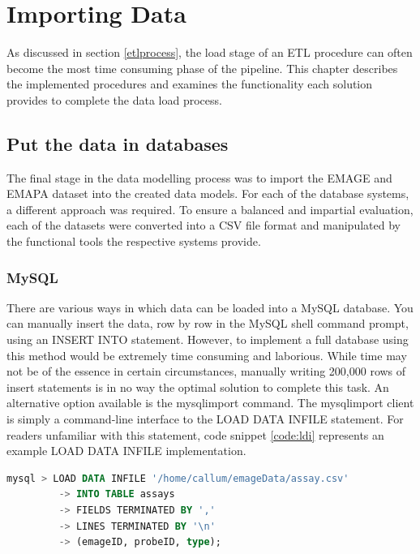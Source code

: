 \chapter{Importing Data}\label{dataload}
As discussed in section \ref{etlprocess}, the load stage of an ETL procedure can often become the most time consuming phase of the pipeline. This chapter describes the implemented procedures and examines the functionality each solution provides to complete the data load process.

\section{Put the data in databases}\label{loadsection}
The final stage in the data modelling process was to import the EMAGE and EMAPA dataset into the created data models. For each of the database systems, a different approach was required. To ensure a balanced and impartial evaluation, each of the datasets were converted into a CSV file format and manipulated by the functional tools the respective systems provide.

\subsection{MySQL}\label{mysqlload}
There are various ways in which data can be loaded into a MySQL database. You can manually insert the data, row by row in the MySQL shell command prompt, using an INSERT INTO statement. However, to implement a full database using this method would be extremely time consuming and laborious. While time may not be of the essence in certain circumstances, manually writing 200,000 rows of insert statements is in no way the optimal solution to complete this task. An alternative option available is the mysqlimport command. The mysqlimport client is simply a command-line interface to the LOAD DATA INFILE statement. For readers unfamiliar with this statement, code snippet \ref{code:ldi} represents an example LOAD DATA INFILE implementation.
\newpage
\begin{lstlisting}[language=SQL, caption=Example LOAD DATA INFILE statement., label=code:ldi]
mysql > LOAD DATA INFILE '/home/callum/emageData/assay.csv'
	 	 -> INTO TABLE assays
		 -> FIELDS TERMINATED BY ','
		 -> LINES TERMINATED BY '\n'
		 -> (emageID, probeID, type);
\end{lstlisting}

